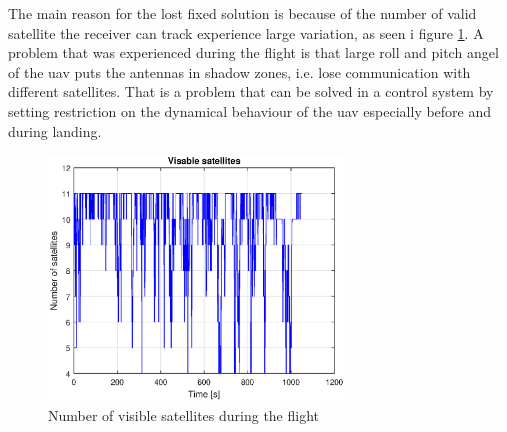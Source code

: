 The main reason for the lost fixed solution is because of the number of valid satellite the receiver can track experience large variation, as seen i figure \ref{figure:numSatFlight}. A problem that was experienced during the flight is that large roll and pitch angel of the \gls{uav} puts the antennas in shadow zones, i.e. lose communication with different satellites. That is a problem that can be solved in a control system by setting restriction on the dynamical behaviour of the \gls{uav} especially before and during landing.
\begin{figure}[H]
	\centering
		\includegraphics[width=0.7\textwidth]{figs/plots/numSatFlight.eps}
		\caption{Number of visible satellites during the flight}
		\label{figure:numSatFlight}
\end{figure}
